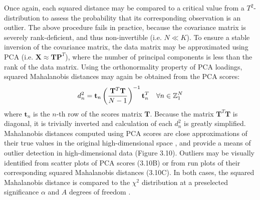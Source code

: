 \begin{doublespace}
Once again, each squared distance may be compared to a critical value from a
$T^2$-distribution to assess the probability that its corresponding observation
is an outlier. The above procedure fails in practice, because the covariance
matrix is severely rank-deficient, and thus non-invertible (i.e. $N \ll K$).
To ensure a stable inversion of the covariance matrix, the data matrix may be
approximated using PCA (i.e. $\mathbf{X} \approx \mathbf{T} \mathbf{P}^T$),
where the number of principal components is less than the rank of the data
matrix. Using the orthonormality property of PCA loadings, squared Mahalanobis
distances may again be obtained from the PCA scores:
\begin{equation}
d_n^2 =
 \mathbf{t}_n
 \left( \frac{\mathbf{T}^T \mathbf{T}}{N - 1} \right)^{-1}
 \mathbf{t}_n^T
 \quad \forall n \in \mathbb{Z}_{1}^{N}
\end{equation}
where $\mathbf{t}_n$ is the $n$-th row of the scores matrix $\mathbf{T}$.
Because the matrix $\mathbf{T}^T \mathbf{T}$ is diagonal, it is trivially
inverted and calculation of each $d_n^2$ is greatly simplified. Mahalanobis
distances computed using PCA scores are close approximations of their true
values in the original high-dimensional space \cite{demaesschalck:cils2000},
and provide a means of outlier detection in high-dimensional data
(Figure 3.10). Outliers may be visually identified from scatter plots of PCA
scores (3.10B) or from run plots of their corresponding squared Mahalanobis
distances (3.10C). In both cases, the squared Mahalanobis distance is compared
to the $\chi^2$ distribution at a preselected significance $\alpha$ and $A$
degrees of freedom \cite{hotelling:ams1931,worley:abio2013}.
\end{doublespace}

